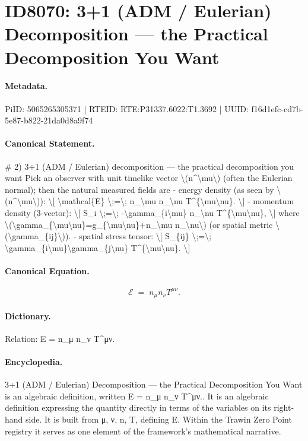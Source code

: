 \section*{ID8070: 3+1 (ADM / Eulerian) Decomposition — the Practical Decomposition You Want}
\paragraph{Metadata.}
PiID: 5065265305371 | RTEID: RTE:P31337.6022:T1.3692 | UUID: f16d1efc-cd7b-5e87-b822-21da0d8a9f74

\paragraph{Canonical Statement.}
\# 2) 3+1 (ADM / Eulerian) decomposition — the practical decomposition you want Pick an observer with unit timelike vector \textbackslash{}(n\textasciicircum{}\textbackslash{}mu\textbackslash{}) (often the Eulerian normal); then the natural measured fields are - energy density (as seen by \textbackslash{}(n\textasciicircum{}\textbackslash{}mu\textbackslash{})): \textbackslash{}[ \textbackslash{}mathcal\{E\} \textbackslash{};=\textbackslash{}; n\_\textbackslash{}mu n\_\textbackslash{}nu T\textasciicircum{}\{\textbackslash{}mu\textbackslash{}nu\}. \textbackslash{}] - momentum density (3-vector): \textbackslash{}[ S\_i \textbackslash{};=\textbackslash{}; -\textbackslash{}gamma\_\{i\textbackslash{}mu\} n\_\textbackslash{}nu T\textasciicircum{}\{\textbackslash{}mu\textbackslash{}nu\}, \textbackslash{}] where \textbackslash{}(\textbackslash{}gamma\_\{\textbackslash{}mu\textbackslash{}nu\}=g\_\{\textbackslash{}mu\textbackslash{}nu\}+n\_\textbackslash{}mu n\_\textbackslash{}nu\textbackslash{}) (or spatial metric \textbackslash{}(\textbackslash{}gamma\_\{ij\}\textbackslash{})). - spatial stress tensor: \textbackslash{}[ S\_\{ij\} \textbackslash{};=\textbackslash{}; \textbackslash{}gamma\_\{i\textbackslash{}mu\}\textbackslash{}gamma\_\{j\textbackslash{}nu\} T\textasciicircum{}\{\textbackslash{}mu\textbackslash{}nu\}. \textbackslash{}]

\paragraph{Canonical Equation.}
\[
\mathcal{E} \;=\; n_\mu n_\nu T^{\mu\nu}.
\]

\paragraph{Dictionary.}
Relation: E = n\_μ n\_ν T\textasciicircum{}μν.

\paragraph{Encyclopedia.}
3+1 (ADM / Eulerian) Decomposition — the Practical Decomposition You Want is an algebraic definition, written E = n\_μ n\_ν T\textasciicircum{}μν.. It is an algebraic definition expressing the quantity directly in terms of the variables on its right-hand side. It is built from μ, ν, n, T, defining E. Within the Trawin Zero Point registry it serves as one element of the framework's mathematical narrative.
